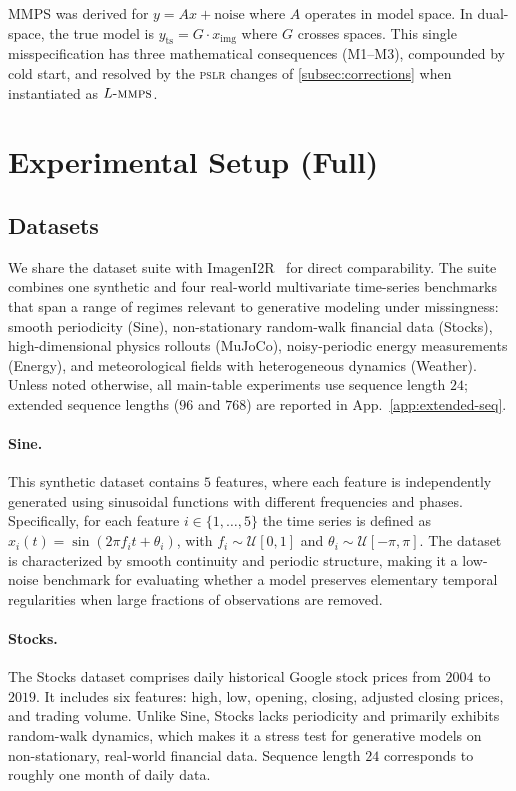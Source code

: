 \documentclass{article}
\theoremstyle{plain}
\theoremstyle{definition}
\theoremstyle{remark}
\newcommand{\pslr}{\textsc{pslr}}
\newcommand{\lmmps}{L\mbox{-}\textsc{mmps}}
\newcommand{\yts}{y_{\mathrm{ts}}}
\newcommand{\ximg}{x_{\mathrm{img}}}
\begin{document}
MMPS was derived for $y = Ax + \mathrm{noise}$ where $A$ operates in model space. In dual-space, the true model is $\yts = G \cdot \ximg$ where $G$ crosses spaces. This single misspecification has three mathematical consequences (M1--M3), compounded by cold start, and resolved by the \pslr{} changes of \cref{subsec:corrections} when instantiated as $\lmmps$.

\section{Experimental Setup (Full)}
\label{app:setup-full}

\subsection{Datasets}
\label{app:datasets}

We share the dataset suite with ImagenI2R~\citep{fadlon2025imageni2r} for direct comparability. The suite combines one synthetic and four real-world multivariate time-series benchmarks that span a range of regimes relevant to generative modeling under missingness: smooth periodicity (Sine), non-stationary random-walk financial data (Stocks), high-dimensional physics rollouts (MuJoCo), noisy-periodic energy measurements (Energy), and meteorological fields with heterogeneous dynamics (Weather). Unless noted otherwise, all main-table experiments use sequence length $24$; extended sequence lengths ($96$ and $768$) are reported in App.~\ref{app:extended-seq}.

\paragraph{Sine.}
This synthetic dataset contains $5$ features, where each feature is independently generated using sinusoidal functions with different frequencies and phases. Specifically, for each feature $i \in \{1, \ldots, 5\}$ the time series is defined as $x_i(t) = \sin(2\pi f_i t + \theta_i)$, with $f_i \sim \mathcal{U}[0, 1]$ and $\theta_i \sim \mathcal{U}[-\pi, \pi]$. The dataset is characterized by smooth continuity and periodic structure, making it a low-noise benchmark for evaluating whether a model preserves elementary temporal regularities when large fractions of observations are removed.

\paragraph{Stocks.}
The Stocks dataset comprises daily historical Google stock prices from $2004$ to $2019$. It includes six features: high, low, opening, closing, adjusted closing prices, and trading volume. Unlike Sine, Stocks lacks periodicity and primarily exhibits random-walk dynamics, which makes it a stress test for generative models on non-stationary, real-world financial data. Sequence length $24$ corresponds to roughly one month of daily data.
\end{document}
